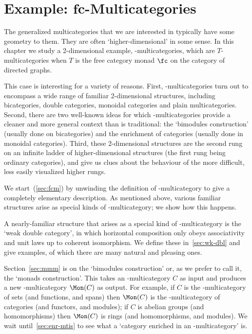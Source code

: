 
\chapter{Example: $\mathbf{fc}$-Multicategories}




\noindent
The generalized multicategories that we are interested in typically have some
geometry to them.  They are often `higher-dimensional' in some sense.  In
this chapter we study a 2-dimensional example, \fc-multicategories, which
are $T$-multicategories when $T$ is the free category monad $\fc$ on the
category of directed graphs.

This case is interesting for a variety of reasons.  First,
\fc-multicategories turn out to encompass a wide range of familiar
2-dimensional structures, including bicategories, double categories,
monoidal categories and plain multicategories.  Second, there are two
well-known ideas for which \fc-multicategories provide a cleaner and more
general context than is traditional: the `bimodules construction' (usually
done on bicategories) and the enrichment of categories (usually done in
monoidal categories).  Third, these 2-dimensional structures are the second
rung on an infinite ladder of higher-dimensional structures (the first rung
being ordinary categories), and give us clues about the behaviour of the
more difficult, less easily visualized higher rungs.

We start~(\ref{sec:fcm}) by unwinding the definition of \fc-multicategory
to give a completely elementary description.  As mentioned above, various
familiar structures arise as special kinds of \fc-multicategory; we show
how this happens.  

A nearly-familiar structure that arises as a special kind of
\fc-multicategory is the `weak double category', in which horizontal
composition only obeys associativity and unit laws up to coherent
isomorphism.  We define these in~\ref{sec:wk-dbl} and give examples, of
which there are many natural and pleasing ones.  

Section~\ref{sec:mmm} is on the `bimodules%
%
%
construction' or, as we prefer
to call it, the `monads%
%
%
construction'.  This takes an \fc-multicategory $C$
as input and produces a new \fc-multicategory $\Mon(C)$ as output.  For
example, if $C$ is the \fc-multicategory of sets (and functions, and spans)
then $\Mon(C)$ is the \fc-multicategory of categories (and functors, and
modules); if $C$ is abelian groups (and homomorphisms) then $\Mon(C)$ is
rings (and homomorphisms, and modules).  We wait until~\ref{sec:enr-mtis}
to see what a `category enriched in an \fc-multicategory' is.




